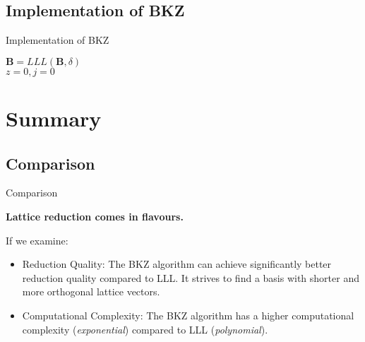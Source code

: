 \documentclass[aspectratio=169]{beamer}
\begin{document}
    \subsection{Implementation of BKZ}

    \begin{frame}[fragile]{Implementation of BKZ}
        \begin{algorithm}[H]
            \caption{BKZ - Algorithm}
            \label{alg:BKZ}

            \Input{A basis $\mathbf{B} = \{\mathbf{b_1, b_2, ..., b_n}\} \text{ of a lattice L, a blocksize } \beta \in [2, n], \text{and a reduction parameter} \delta \in (0.25, 1] \text{ of LLL}$}

            $\mathbf{B} = LLL(\mathbf{B}, \delta)$ \\
            $z = 0, j = 0$ \\
        \end{algorithm}
    \end{frame}

    \section{Summary}
    \subsection{Comparison}

    \begin{frame}{Comparison}
        \begin{center}
            \textbf{Lattice reduction comes in flavours.}
        \end{center}

        If we examine: 
        \begin{itemize}
            \item Reduction Quality:
                The BKZ algorithm can achieve significantly better reduction quality compared to LLL. It strives to find a basis with shorter and more orthogonal lattice vectors.
            \item Computational Complexity:
                The BKZ algorithm has a higher computational complexity (\emph{exponential}) compared to LLL (\emph{polynomial}).
        \end{itemize}
    \end{frame}
\end{document}
